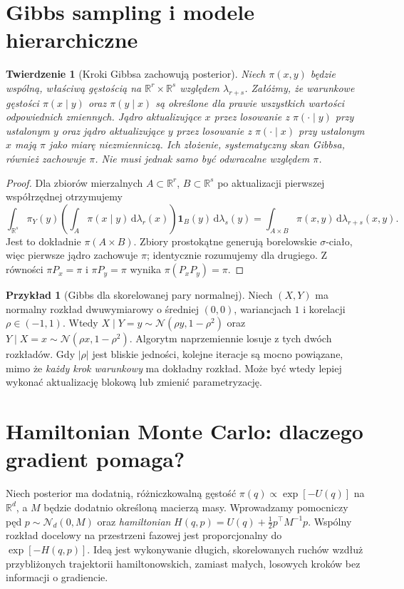 \documentclass[11pt,a4paper,oneside]{report}
\numberwithin{equation}{chapter}
\theoremstyle{plain}
\newtheorem{twierdzenie}{Twierdzenie}[chapter]
\theoremstyle{definition}
\newtheorem{przyklad}{Przykład}[chapter]
\theoremstyle{remark}
\newcommand{\R}{\mathbb R}
\newcommand{\ind}[1]{\mathbf 1_{#1}}
\newcommand{\dd}{\mathrm d}
\newcommand{\Normal}{\mathcal N}
\begin{document}
\section{Gibbs sampling i modele hierarchiczne}
\begin{twierdzenie}[Kroki Gibbsa zachowują posterior]
\label{thm:gibbs-invariant}
Niech $\pi(x,y)$ będzie wspólną, właściwą gęstością
na $\R^r\times\R^s$ względem $\lambda_{r+s}$.
Załóżmy, że warunkowe gęstości $\pi(x\mid y)$ oraz
$\pi(y\mid x)$ są określone dla prawie wszystkich
wartości odpowiednich zmiennych. Jądro aktualizujące
$x$ przez losowanie z $\pi(\cdot\mid y)$ przy
ustalonym $y$ oraz jądro aktualizujące $y$ przez
losowanie z $\pi(\cdot\mid x)$ przy ustalonym $x$
mają $\pi$ jako miarę niezmienniczą. Ich złożenie,
\emph{systematyczny skan Gibbsa}, również zachowuje $\pi$.
Nie musi jednak samo być odwracalne względem $\pi$.
\end{twierdzenie}
\begin{proof}
Dla zbiorów mierzalnych $A\subset\R^r$, $B\subset\R^s$
po aktualizacji pierwszej współrzędnej otrzymujemy
\[
 \int_{\R^s}\pi_Y(y)
 \left(\int_A\pi(x\mid y)\,\dd\lambda_r(x)\right)
 \ind{B}(y)\,\dd\lambda_s(y)
 =\int_{A\times B}\pi(x,y)\,\dd\lambda_{r+s}(x,y).
\]
Jest to dokładnie $\pi(A\times B)$. Zbiory prostokątne
generują borelowskie $\sigma$-ciało, więc pierwsze
jądro zachowuje $\pi$; identycznie rozumujemy dla drugiego.
Z równości $\pi P_x=\pi$ i $\pi P_y=\pi$
wynika $\pi(P_xP_y)=\pi$.
\end{proof}

\begin{przyklad}[Gibbs dla skorelowanej pary normalnej]
Niech $(X,Y)$ ma normalny rozkład dwuwymiarowy o średniej
$(0,0)$, wariancjach $1$ i korelacji $\rho\in(-1,1)$.
Wtedy
$X\mid Y=y\sim\Normal(\rho y,1-\rho^2)$ oraz
$Y\mid X=x\sim\Normal(\rho x,1-\rho^2)$.
Algorytm naprzemiennie losuje z tych dwóch rozkładów.
Gdy $|\rho|$ jest bliskie jedności, kolejne iteracje
są mocno powiązane, mimo że \emph{każdy krok warunkowy}
ma dokładny rozkład. Może być wtedy lepiej wykonać
aktualizację blokową lub zmienić parametryzację.
\end{przyklad}

\section{Hamiltonian Monte Carlo: dlaczego gradient pomaga?}
\label{sec:hmc-intro}
Niech posterior ma dodatnią, różniczkowalną gęstość
$\pi(q)\propto\exp[-U(q)]$ na $\R^d$, a $M$
będzie dodatnio określoną macierzą masy. Wprowadzamy
pomocniczy pęd $p\sim\Normal_d(0,M)$ oraz
\emph{hamiltonian} $H(q,p)=U(q)+\frac12p^\top M^{-1}p$.
Wspólny rozkład docelowy na przestrzeni fazowej
jest proporcjonalny do $\exp[-H(q,p)]$.
Ideą jest wykonywanie długich, skorelowanych ruchów
wzdłuż przybliżonych trajektorii hamiltonowskich,
zamiast małych, losowych kroków bez informacji o gradiencie.
\end{document}
